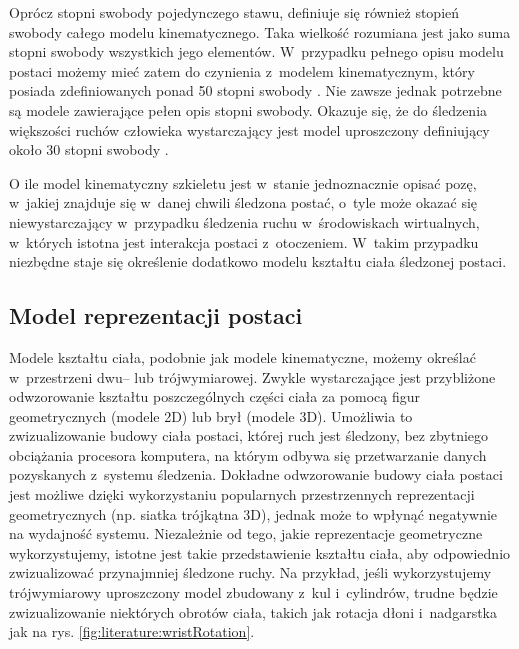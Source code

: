 Oprócz stopni swobody pojedynczego stawu, definiuje się również stopień swobody całego modelu kinematycznego. Taka wielkość rozumiana jest jako suma stopni swobody wszystkich jego elementów. W~przypadku pełnego opisu modelu postaci możemy mieć zatem do czynienia z~modelem kinematycznym, który posiada zdefiniowanych ponad 50 stopni swobody \cite{Agarwal2006}. Nie zawsze jednak potrzebne są modele zawierające pełen opis stopni swobody. Okazuje się, że do śledzenia większości ruchów człowieka wystarczający jest model uproszczony definiujący około 30 stopni swobody \cite{Sigal2006,Kwolek2011}.
													
O ile model kinematyczny szkieletu jest w~stanie jednoznacznie opisać pozę, w~jakiej znajduje się w~danej chwili śledzona postać, o~tyle może okazać się niewystarczający w~przypadku śledzenia ruchu w~środowiskach wirtualnych, w~których istotna jest interakcja postaci z~otoczeniem. W~takim przypadku niezbędne staje się określenie dodatkowo modelu kształtu ciała śledzonej postaci.
															
\subsection{Model reprezentacji postaci}
Modele kształtu ciała, podobnie jak modele kinematyczne, możemy określać w~przestrzeni dwu-- lub trójwymiarowej. Zwykle wystarczające jest przybliżone odwzorowanie kształtu poszczególnych części ciała za pomocą figur geometrycznych (modele 2D) lub brył (modele 3D). Umożliwia to zwizualizowanie budowy ciała postaci, której ruch jest śledzony, bez zbytniego obciążania procesora komputera, na którym odbywa się przetwarzanie danych pozyskanych z~systemu śledzenia. Dokładne odwzorowanie budowy ciała postaci jest możliwe dzięki wykorzystaniu popularnych przestrzennych reprezentacji geometrycznych (np. siatka trójkątna 3D), jednak może to wpłynąć negatywnie na wydajność systemu. 
Niezależnie od tego, jakie reprezentacje geometryczne wykorzystujemy, istotne jest takie przedstawienie kształtu ciała, aby odpowiednio zwizualizować przynajmniej śledzone ruchy. Na przykład, jeśli wykorzystujemy trójwymiarowy uproszczony model zbudowany z~kul i~cylindrów, trudne będzie zwizualizowanie niektórych obrotów ciała, takich jak rotacja dłoni i~nadgarstka jak na rys. \ref{fig:literature:wristRotation}.
															
